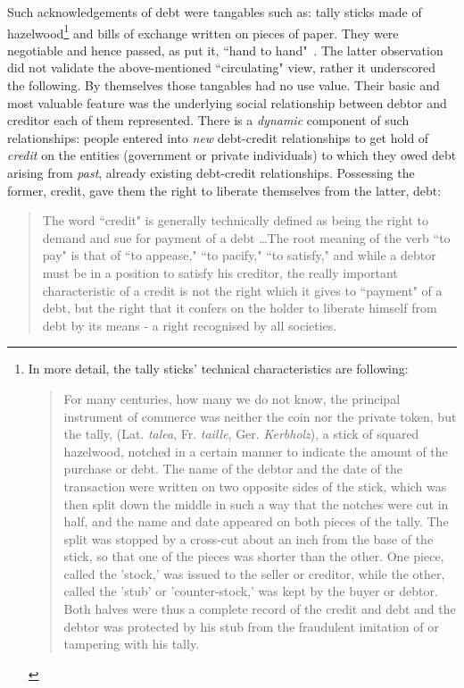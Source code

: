 Such acknowledgements of debt were tangables such as: tally sticks made of hazelwood\footnote{In more detail, the tally sticks' technical characteristics are following: \begin{quote}For many centuries, how many we do not know, the principal
 instrument of commerce was neither the coin nor the private token, but
 the tally, (Lat. \textit{talea}, Fr. \textit{taille}, Ger. \textit{Kerbholz}), a stick of squared hazelwood, notched in a certain manner to indicate the amount of the
 purchase or debt. The name of the debtor and the date of the transaction
 were written on two opposite sides of the stick, which was then split down
 the middle in such a way that the notches were cut in half, and the name
 and date appeared on both pieces of the tally. The split was stopped by a
 cross-cut about an inch from the base of the stick, so that one of the pieces 
was shorter than the other. One piece, called the 'stock,' was issued to
 the seller or creditor, while the other, called the 'stub' or 'counter-stock,'
 was kept by the buyer or debtor. Both halves were thus a complete record
 of the credit and debt and the debtor was protected by his stub from the
 fraudulent imitation of or tampering with his tally.~\citep[p.~394]{innes1913}\end{quote}} and bills of exchange written on pieces of paper. They were negotiable and hence passed, as \citeauthor{innes1913} put it, ``hand to hand"~\citep[p.~396]{innes1913}. The latter observation did not validate the above-mentioned ``circulating" view, rather it underscored the following. By themselves those tangables had no use value. Their basic and most valuable feature was the underlying social relationship between debtor and creditor each of them represented. There is a \textit{dynamic} component of such relationships: people entered into \textit{new} debt-credit relationships to get hold of \textit{credit} on the entities (government or private individuals) to which they owed debt arising from \textit{past}, already existing debt-credit relationships. Possessing the former, credit, gave them the right to liberate themselves from the latter, debt:

\begin{quote}
 The word ``credit" is generally technically defined as being the right to
 demand and sue for payment of a debt \dots The root meaning of the verb ``to pay" is
 that of ``to appease," ``to pacify," ``to satisfy," and while a debtor must
 be in a position to satisfy his creditor, the really important characteristic
 of a credit is not the right which it gives to ``payment" of a debt, but the
 right that it confers on the holder to liberate himself from debt by its
 means - a right recognised by all societies.~\citep[pp.~392-393]{innes1913}
\end{quote}

